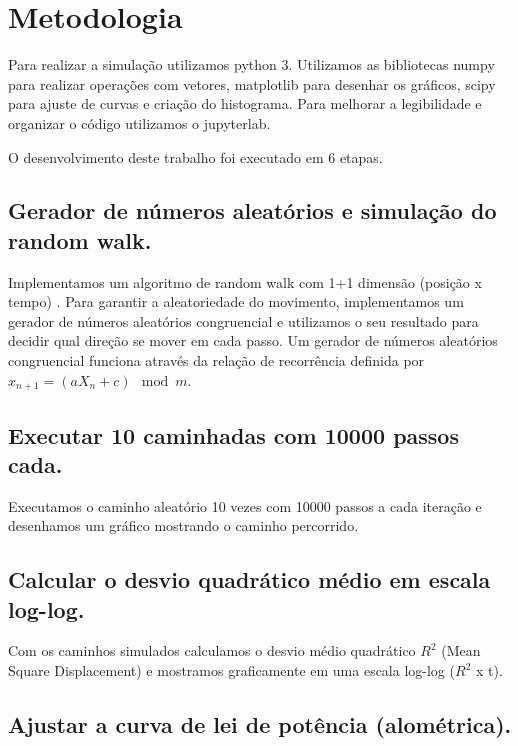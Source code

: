 
\chapter{Metodologia}
\label{chap_metodologia}
Para realizar a simulação utilizamos python 3. Utilizamos as bibliotecas numpy para realizar operações com vetores, matplotlib para desenhar os gráficos, scipy para ajuste de curvas e criação do histograma. Para melhorar a legibilidade e organizar o código utilizamos o jupyterlab.

O desenvolvimento deste trabalho foi executado em 6 etapas.

\section{Gerador de números aleatórios e simulação do random walk.}
\label{sec_1}

Implementamos um algoritmo de random walk com 1+1 dimensão (posição x tempo) \cite{RandomWalk}. Para garantir a aleatoriedade do movimento, implementamos um gerador de números aleatórios congruencial e utilizamos o seu resultado para decidir qual direção se mover em cada passo. Um gerador de números aleatórios congruencial funciona através da relação de recorrência definida por $ x_{n+1} = (aX_{n} + c)  \mod  m $.

\section{Executar 10 caminhadas com 10000 passos cada.}
\label{sec_2}

Executamos o caminho aleatório 10 vezes com 10000 passos a cada iteração e desenhamos um gráfico mostrando o caminho percorrido. 

\section{Calcular o desvio quadrático médio em escala log-log.}
\label{sec_3}

Com os caminhos simulados calculamos o desvio médio quadrático $R^{2}$ (Mean Square Displacement) e mostramos graficamente em uma escala log-log ($R^{2}$ x t). 

\section{Ajustar a curva de lei de potência (alométrica).}
\label{sec_4}

